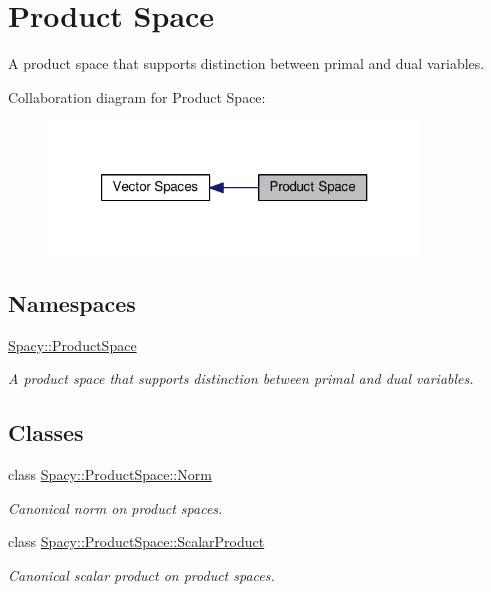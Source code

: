 \hypertarget{group__ProductSpaceGroup}{\section{Product Space}
\label{group__ProductSpaceGroup}
}


A product space that supports distinction between primal and dual variables.  


Collaboration diagram for Product Space\-:
\nopagebreak
\begin{figure}[H]
\begin{center}
\leavevmode
\includegraphics[width=280pt]{group__ProductSpaceGroup}
\end{center}
\end{figure}
\subsection*{Namespaces}
\begin{DoxyCompactItemize}
\item 
\hyperlink{namespaceSpacy_1_1ProductSpace}{Spacy\-::\-Product\-Space}
\begin{DoxyCompactList}\small\item\em A product space that supports distinction between primal and dual variables. \end{DoxyCompactList}\end{DoxyCompactItemize}
\subsection*{Classes}
\begin{DoxyCompactItemize}
\item 
class \hyperlink{classSpacy_1_1ProductSpace_1_1Norm}{Spacy\-::\-Product\-Space\-::\-Norm}
\begin{DoxyCompactList}\small\item\em Canonical norm on product spaces. \end{DoxyCompactList}\item 
class \hyperlink{classSpacy_1_1ProductSpace_1_1ScalarProduct}{Spacy\-::\-Product\-Space\-::\-Scalar\-Product}
\begin{DoxyCompactList}\small\item\em Canonical scalar product on product spaces. \end{DoxyCompactList}\end{DoxyCompactItemize}
